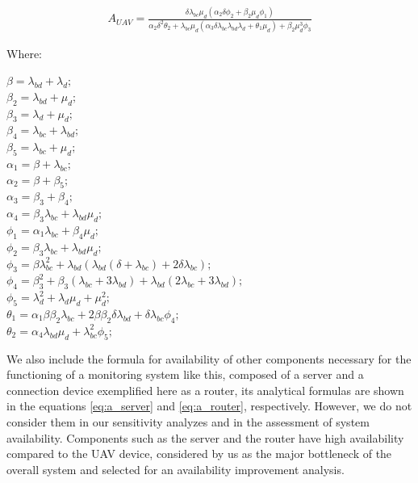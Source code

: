 \documentclass[conference]{IEEEtran}
\begin{document}
\begin{align}\label{eq:a_uav}
A_{UAV} = \frac{\delta  \lambda_{bc} \mu_{d} (\alpha_{2} \delta \phi_{2} + \beta_{2} \mu_{d} \phi_{1})}{ \alpha_{2} \delta^{2} \theta_{2} + \lambda_{bc} \mu_{d} (\alpha_{3} \delta  \lambda_{bc} \lambda_{bd} \lambda_{d} + \theta_{1} \mu_{d})+ \beta_{2} \mu_{d}^{3} \phi_{3}}
\end{align}

Where: \\

\begin{minipage}{.8\textwidth}%
\(\beta = \lambda_{bd} + \lambda_{d};\) \\
\(\beta_{2} = \lambda_{bd} + \mu_{d};\) \\
\(\beta_{3} = \lambda_{d} + \mu_{d};\) \\
\(\beta_{4} = \lambda_{bc} + \lambda_{bd};\) \\
\(\beta_{5} = \lambda_{bc} + \mu_{d};\) \\
\(\alpha_{1} = \beta + \lambda_{bc};\) \\
\(\alpha_{2} = \beta + \beta_{5};\) \\
\(\alpha_{3} = \beta_{3} + \beta_{4};\) \\
\(\alpha_{4} = \beta_{3}\lambda_{bc} + \lambda_{bd} \mu_{d};\) \\
\(\phi_{1} = \alpha_{1}\lambda_{bc} + \beta_{4} \mu_{d};\) \\
\(\phi_{2} = \beta_{3}\lambda_{bc} + \lambda_{bd} \mu_{d};\) \\
\(\phi_{3} = \beta \lambda_{bc}^{2} + \lambda_{bd} (\lambda_{bd} (\delta + \lambda_{bc}) + 2 \delta \lambda_{bc});\) \\
\(\phi_{4} = \beta_{3}^{2} + \beta_{3} (\lambda_{bc} + 3 \lambda_{bd}) + \lambda_{bd} (2 \lambda_{bc} + 3 \lambda_{bd});\) \\
\(\phi_{5} = \lambda_{d}^{2} + \lambda_{d} \mu_{d} + \mu_{d}^{2} ;\) \\
\(\theta_{1} = \alpha_{1} \beta  \beta_{2} \lambda_{bc} + 2 \beta  \beta_{2}  \delta \lambda_{bd}+ \delta  \lambda_{bc} \phi_{4};\) \\
\(\theta_{2} =  \alpha_{4} \lambda_{bd} \mu_{d} + \lambda_{bc}^{2} \phi_{5};\) \\
\end{minipage}%

We also include the formula for availability of other components necessary for the functioning of a monitoring system like this, composed of a server and a connection device exemplified here as a router, its analytical formulas are shown in the equations \ref{eq:a_server} and \ref{eq:a_router}, respectively. However, we do not consider them in our sensitivity analyzes and in the assessment of system availability. Components such as the server and the router have high availability compared to the UAV device, considered by us as the major bottleneck of the overall system and selected for an availability improvement analysis.
\end{document}
